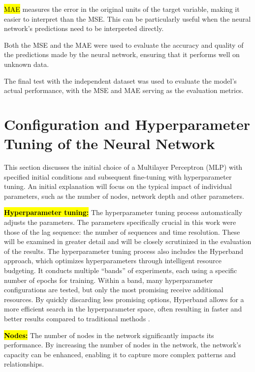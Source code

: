 \documentclass[energies,article,accept,pdftex,moreauthors]{Definitions/mdpi}
\begin{document}
\hl{MAE} measures the error in the original units of the target variable, making it easier to interpret than the MSE. This can be particularly useful when the neural network's predictions need to be interpreted directly.

Both the MSE and the MAE were used to evaluate the accuracy and quality of the predictions made by the neural network, ensuring that it performs well on unknown data.

The final test with the independent dataset was used to evaluate the model's actual performance, with the MSE and MAE serving as the evaluation metrics.

\section{Configuration and Hyperparameter Tuning of the Neural Network}

This section discusses the initial choice of a Multilayer Perceptron (MLP) with specified initial conditions and subsequent fine-tuning with hyperparameter tuning. An initial explanation will focus on the typical impact of individual parameters, such as the number of nodes, network depth and other parameters.

\textbf{\hl{Hyperparameter tuning:} %
} The hyperparameter tuning process automatically adjusts the parameters. The parameters specifically crucial in this work were those of the lag sequence: the number of sequences and time resolution. These will be examined in greater detail and will be closely scrutinized in the evaluation of the results. The hyperparameter tuning process also includes the Hyperband approach, which optimizes hyperparameters through intelligent resource budgeting. It conducts multiple ``bands'' of experiments, each using a specific number of epochs for training. Within a band, many hyperparameter configurations are tested, but only the most promising receive additional resources. By quickly discarding less promising options, Hyperband allows for a more efficient search in the hyperparameter space, often resulting in faster and better results compared to traditional methods \cite{Li.20182016}. %

\textbf{\hl{Nodes:}} The number of nodes in the network significantly impacts its performance. By increasing the number of nodes in the network, the network's capacity can be enhanced, enabling it to capture more complex patterns and relationships.
\end{document}
